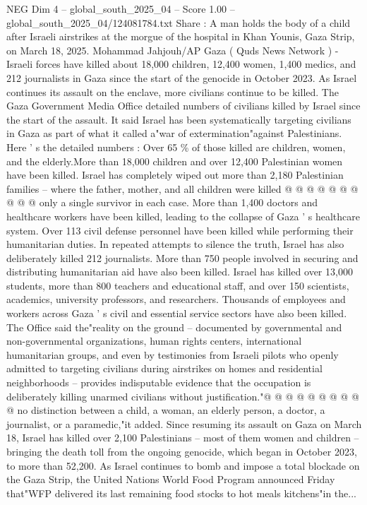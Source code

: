 \begin{textsample}{NEG Dim 4 – global\_south\_2025\_04 – Score 1.00 – global\_south\_2025\_04/124081784.txt}  \label{ex:f4_neg_236}
Share : A man holds the body of a child after Israeli airstrikes at the morgue of the hospital in Khan Younis, Gaza Strip, on March 18, 2025.
Mohammad Jahjouh/AP Gaza ( Quds News Network ) - Israeli forces have killed about 18,000 children, 12,400 women, 1,400 medics, and 212 journalists in Gaza since the start of the genocide in October 2023.
As Israel continues its assault on the enclave, more civilians continue to be killed.
The Gaza Government Media Office detailed numbers of civilians killed by Israel since the start of the assault.
It said Israel has been systematically targeting civilians in Gaza as part of what it called a"war of extermination"against Palestinians.
Here ' s the detailed numbers : Over 65 \% of those killed are children, women, and the elderly.More than 18,000 children and over 12,400 Palestinian women have been killed.
Israel has completely wiped out more than 2,180 Palestinian families -- where the father, mother, and all children were killed @ @ @ @ @ @ @ @ @ @ only a single survivor in each case.
More than 1,400 doctors and healthcare workers have been killed, leading to the collapse of Gaza ' s healthcare system.
Over 113 civil defense personnel have been killed while performing their humanitarian duties.
In repeated attempts to silence the truth, Israel has also deliberately killed 212 journalists.
More than 750 people involved in securing and distributing humanitarian aid have also been killed.
Israel has killed over 13,000 students, more than 800 teachers and educational staff, and over 150 scientists, academics, university professors, and researchers.
Thousands of employees and workers across Gaza ' s civil and essential service sectors have also been killed.
The Office said the"reality on the ground -- documented by governmental and non-governmental organizations, human rights centers, international humanitarian groups, and even by testimonies from Israeli pilots who openly admitted to targeting civilians during airstrikes on homes and residential neighborhoods -- provides indisputable evidence that the occupation is deliberately killing unarmed civilians without justification."@ @ @ @ @ @ @ @ @ @ no distinction between a child, a woman, an elderly person, a doctor, a journalist, or a paramedic,"it added.
Since resuming its assault on Gaza on March 18, Israel has killed over 2,100 Palestinians -- most of them women and children -- bringing the death toll from the ongoing genocide, which began in October 2023, to more than 52,200.
As Israel continues to bomb and impose a total blockade on the Gaza Strip, the United Nations World Food Program announced Friday that"WFP delivered its last remaining food stocks to hot meals kitchens"in the...

\end{textsample}
